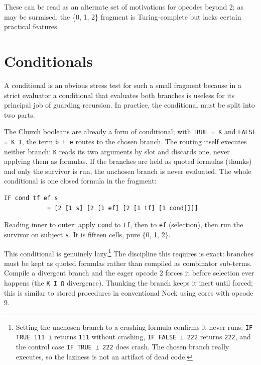 \documentclass[twoside]{article}
\begin{document}
\noindent
These can be read as an alternate set of motivations for opcodes beyond 2; as may be surmised, the \{0, 1, 2\} fragment is Turing-complete but lacks certain practical features.

\section{Conditionals}

A conditional is an obvious stress test for such a small fragment because in a strict evaluator a conditional that evaluates both branches is useless for its principal job of guarding recursion.  In practice, the conditional must be split into two parts.

The Church booleans are already a form of conditional; with \lstinline[style=inlinecode]{TRUE = K} and \lstinline[style=inlinecode]{FALSE = K I}, the term \lstinline[style=inlinecode]{b t e} routes to the chosen branch.  The routing itself executes neither branch:  \lstinline[style=inlinecode]{K} reads its two arguments by slot and discards one, never applying them as formulas.  If the branches are held as quoted formulas (thunks) and only the survivor is run, the unchosen branch is never evaluated.  The whole conditional is one closed formula in the fragment:

\begin{lstlisting}[style=listingblock]
IF cond tf ef s
            = [2 [1 s] [2 [1 ef] [2 [1 tf] [1 cond]]]]
\end{lstlisting}

\noindent
Reading inner to outer:  apply \lstinline[style=inlinecode]{cond} to \lstinline[style=inlinecode]{tf}, then to \lstinline[style=inlinecode]{ef} (selection), then run the survivor on subject \lstinline[style=inlinecode]{s}. It is fifteen cells, pure \{0, 1, 2\}.

This conditional is genuinely lazy.\footnote{Setting the unchosen branch to a crashing formula confirms it never runs: \texttt{IF TRUE 111 ⊥} returns \texttt{111} without crashing, \texttt{IF FALSE ⊥ 222} returns \texttt{222}, and the control case \texttt{IF TRUE ⊥ 222} does crash.  The chosen branch really executes, so the laziness is not an artifact of dead
code.}  The discipline this requires is exact:  branches must be kept as quoted
formulas rather than compiled as combinator sub-terms.  Compile a divergent branch and the eager opcode 2 forces it before selection ever happens (the \texttt{K I Ω} divergence).  Thunking the branch keeps it inert until forced; this is similar to stored procedures in conventional Nock using cores with opcode 9.
\end{document}
